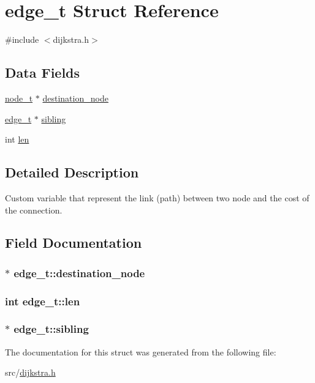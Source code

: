 \hypertarget{structedge__t}{\section{edge\-\_\-t Struct Reference}
\label{structedge__t}
}


{\ttfamily \#include $<$dijkstra.\-h$>$}

\subsection*{Data Fields}
\begin{DoxyCompactItemize}
\item 
\hyperlink{structnode__t}{node\-\_\-t} $\ast$ \hyperlink{structedge__t_af254210a419032ad757878604a79990f}{destination\-\_\-node}
\item 
\hyperlink{structedge__t}{edge\-\_\-t} $\ast$ \hyperlink{structedge__t_ae6d9ea98cfeac37c990c0f89e0d4e019}{sibling}
\item 
int \hyperlink{structedge__t_a2ae2ca5af012de425185ab1986081b11}{len}
\end{DoxyCompactItemize}


\subsection{Detailed Description}
Custom variable that represent the link (path) between two node and the cost of the connection. 

\subsection{Field Documentation}
\hypertarget{structedge__t_af254210a419032ad757878604a79990f}{
\subsubsection[{destination\-\_\-node}]{$\ast$ edge\-\_\-t\-::destination\-\_\-node}}\label{structedge__t_af254210a419032ad757878604a79990f}
\hypertarget{structedge__t_a2ae2ca5af012de425185ab1986081b11}{
\subsubsection[{len}]{\setlength{\rightskip}{0pt plus 5cm}int edge\-\_\-t\-::len}}\label{structedge__t_a2ae2ca5af012de425185ab1986081b11}
\hypertarget{structedge__t_ae6d9ea98cfeac37c990c0f89e0d4e019}{
\subsubsection[{sibling}]{$\ast$ edge\-\_\-t\-::sibling}}\label{structedge__t_ae6d9ea98cfeac37c990c0f89e0d4e019}


The documentation for this struct was generated from the following file\-:\begin{DoxyCompactItemize}
\item 
src/\hyperlink{dijkstra_8h}{dijkstra.\-h}\end{DoxyCompactItemize}
